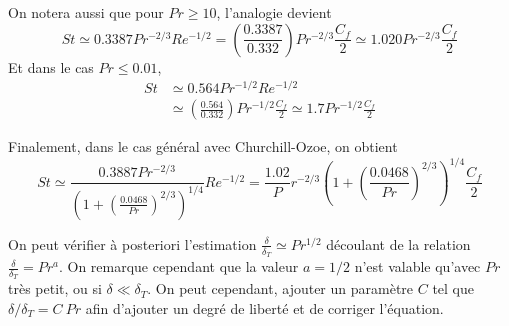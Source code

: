       On notera aussi que pour $Pr\geq 10$, l'analogie devient
      \begin{equation}
        St \simeq 0.3387 Pr^{-2/3} Re^{-1/2} = \left(\frac{0.3387}{0.332}\right) Pr^{-2/3} \frac{C_f}{2} \simeq 1.020 Pr^{-2/3} \frac{C_f}{2}
      \end{equation}
      Et dans le cas $Pr \leq 0.01$,
      \begin{equation}
        \begin{aligned}
          St &\simeq 0.564 Pr^{-1/2} Re^{-1/2}\\
          &\simeq \left(\frac{0.564}{0.332}\right) Pr^{-1/2} \frac{C_f}{2} \simeq 1.7 Pr^{-1/2} \frac{C_f}{2}
        \end{aligned}
      \end{equation}

      Finalement, dans le cas général avec Churchill-Ozoe, on obtient
      \begin{equation}
        St \simeq \frac{0.3887 Pr^{-2/3}}{\left(1 + \left(\frac{0.0468}{Pr}\right)^{2/3}\right)^{1/4}} Re^{-1/2} = \frac{1.02}Pr^{-2/3}{\left(1+\left(\frac{0.0468}{Pr}\right)^{2/3}\right)^{1/4}} \frac{C_f}{2}
      \end{equation}

      On peut vérifier à posteriori l'estimation $\frac{\delta}{\delta_T} \simeq Pr^{1/2}$ découlant de la relation $\frac{\delta}{\delta_T} = Pr^a$. On remarque cependant que la valeur $a = 1/2$ n'est valable qu'avec $Pr$ très petit, ou si $\delta \ll \delta_T$. On peut cependant, ajouter un paramètre $C$ tel que $\delta/\delta_T = C~Pr$ afin d'ajouter un degré de liberté et de corriger l'équation. 
